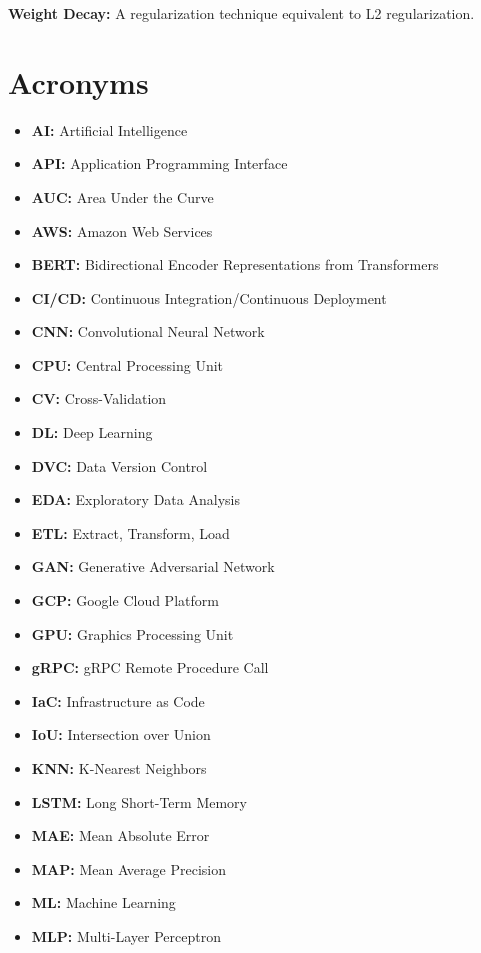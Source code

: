 \textbf{Weight Decay:} A regularization technique equivalent to L2 regularization.

\section*{Acronyms}

\begin{itemize}
    \item \textbf{AI:} Artificial Intelligence
    \item \textbf{API:} Application Programming Interface
    \item \textbf{AUC:} Area Under the Curve
    \item \textbf{AWS:} Amazon Web Services
    \item \textbf{BERT:} Bidirectional Encoder Representations from Transformers
    \item \textbf{CI/CD:} Continuous Integration/Continuous Deployment
    \item \textbf{CNN:} Convolutional Neural Network
    \item \textbf{CPU:} Central Processing Unit
    \item \textbf{CV:} Cross-Validation
    \item \textbf{DL:} Deep Learning
    \item \textbf{DVC:} Data Version Control
    \item \textbf{EDA:} Exploratory Data Analysis
    \item \textbf{ETL:} Extract, Transform, Load
    \item \textbf{GAN:} Generative Adversarial Network
    \item \textbf{GCP:} Google Cloud Platform
    \item \textbf{GPU:} Graphics Processing Unit
    \item \textbf{gRPC:} gRPC Remote Procedure Call
    \item \textbf{IaC:} Infrastructure as Code
    \item \textbf{IoU:} Intersection over Union
    \item \textbf{KNN:} K-Nearest Neighbors
    \item \textbf{LSTM:} Long Short-Term Memory
    \item \textbf{MAE:} Mean Absolute Error
    \item \textbf{MAP:} Mean Average Precision
    \item \textbf{ML:} Machine Learning
    \item \textbf{MLP:} Multi-Layer Perceptron

\end{itemize}
